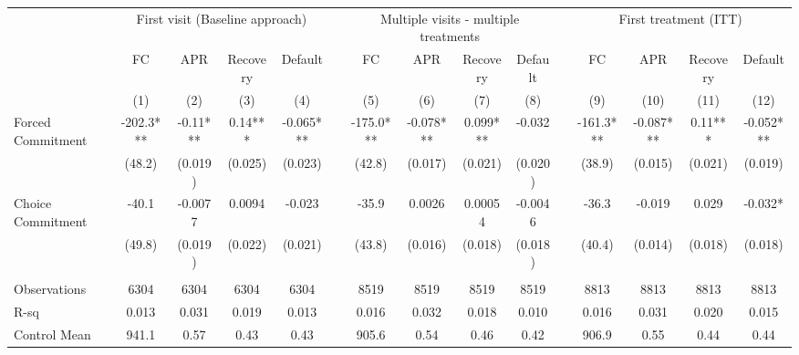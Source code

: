 \begin{tabular}{lcccccccccccccc}
\toprule
      & \multicolumn{4}{c}{First visit (Baseline approach)} &       & \multicolumn{4}{c}{Multiple visits - multiple treatments} &       & \multicolumn{4}{c}{First treatment (ITT)} \\
\cmidrule{7-10}\cmidrule{12-15}      & FC    & APR   & Recovery & Default &       & FC    & APR   & Recovery & Default &       & FC    & APR   & Recovery & Default \\
\midrule
      & (1)   & (2)   & (3)   & (4)   &       & (5)   & (6)   & (7)   & (8)   &       & (9)   & (10)  & (11)  & (12) \\
\midrule
\midrule
Forced Commitment & -202.3*** & -0.11*** & 0.14*** & -0.065*** &       & -175.0*** & -0.078*** & 0.099*** & -0.032 &       & -161.3*** & -0.087*** & 0.11*** & -0.052*** \\
      & (48.2) & (0.019) & (0.025) & (0.023) &       & (42.8) & (0.017) & (0.021) & (0.020) &       & (38.9) & (0.015) & (0.021) & (0.019) \\
Choice Commitment & -40.1 & -0.0077 & 0.0094 & -0.023 &       & -35.9 & 0.0026 & 0.00054 & -0.0046 &       & -36.3 & -0.019 & 0.029 & -0.032* \\
      & (49.8) & (0.019) & (0.022) & (0.021) &       & (43.8) & (0.016) & (0.018) & (0.018) &       & (40.4) & (0.014) & (0.018) & (0.018) \\
      &       &       &       &       &       &       &       &       &       &       &       &       &       &  \\
\midrule
Observations & 6304  & 6304  & 6304  & 6304  &       & 8519  & 8519  & 8519  & 8519  &       & 8813  & 8813  & 8813  & 8813 \\
R-sq  & 0.013 & 0.031 & 0.019 & 0.013 &       & 0.016 & 0.032 & 0.018 & 0.010 &       & 0.016 & 0.031 & 0.020 & 0.015 \\
Control Mean & 941.1 & 0.57  & 0.43  & 0.43  &       & 905.6 & 0.54  & 0.46  & 0.42  &       & 906.9 & 0.55  & 0.44  & 0.44 \\
\bottomrule
\bottomrule
\end{tabular}%
